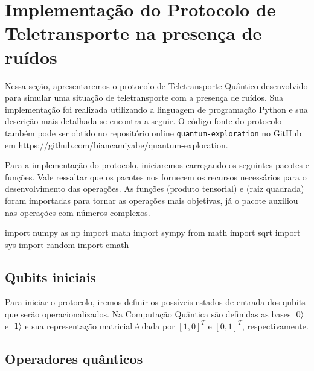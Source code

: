 
\chapter{Implementação do Protocolo de Teletransporte na presença de ruídos}\label{app:protocolo}

Nessa seção, apresentaremos o protocolo de Teletransporte Quântico desenvolvido para simular uma situação de teletransporte com a presença de ruídos. Sua implementação foi realizada utilizando a linguagem de programação Python e sua descrição mais detalhada se encontra a seguir. O código-fonte do protocolo também pode ser obtido no repositório online \texttt{quantum-exploration} no GitHub em \hypertarget{repositório}{https://github.com/biancamiyabe/quantum-exploration}.

Para a implementação do protocolo, iniciaremos carregando os seguintes pacotes e funções. Vale ressaltar que os pacotes nos fornecem os recursos necessários para o desenvolvimento das operações. As funções  (produto tensorial) e  (raiz quadrada) foram importadas para tornar as operações mais objetivas, já o pacote  auxiliou nas operações com números complexos.
\begin{pycode}
    import numpy as np
	import math
	import sympy
	from math import sqrt
	import sys
	import random
	import cmath
\end{pycode}

\section{Qubits iniciais}\label{qubits-iniciais}

Para iniciar o protocolo, iremos definir os possíveis estados de entrada dos qubits que serão operacionalizados. Na Computação Quântica são definidas as bases \(\ket{0}\) e \(\ket{1}\) e sua representação matricial é dada por \([1, 0]^{T}\) e \([0, 1]^{T}\), respectivamente.

\section{Operadores quânticos}\label{operadores-quuxe2nticos}


